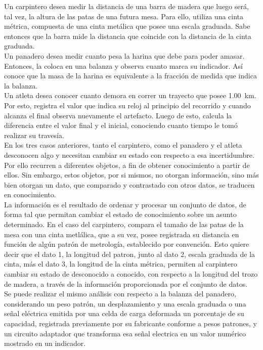Un carpintero desea medir la distancia de una barra de madera que luego será, tal vez, la altura de las patas de una futura mesa. Para ello, utiliza una cinta métrica, compuesta de una cinta metálica que posee una escala graduada. Sabe entonces que la barra mide la distancia que coincide con la distancia de la cinta graduada.\\

Un panadero desea medir cuanto pesa la harina que debe para poder amasar. Entonces, la coloca en una balanza y observa cuanto marca su indicador. Así conoce que la masa de la harina es equivalente a la fracción de medida que indica la balanza.\\

Un atleta desea conocer cuanto demora en correr un trayecto que posee \SI{1.00}{\kilo\meter}. Por esto, registra el valor que indica su reloj al principio del recorrido y cuando alcanza el final observa nuevamente el artefacto. Luego de esto, calcula la diferencia entre el valor final y el inicial, conociendo cuanto tiempo le tomó realizar su travesía.\\

En los tres casos anteriores, tanto el carpintero, como el panadero y el atleta desconocen algo y necesitan cambiar su estado con respecto a esa incertidumbre. Por ello recurren a diferentes objetos, a fin de obtener conocimiento a partir de ellos. Sin embargo, estos objetos, por si mismos, no otorgan información, sino más bien otorgan un dato, que comparado y contrastado con otros datos, se traducen en conocimiento.\\

La información es el resultado de ordenar y procesar un conjunto de datos, de forma tal que permitan cambiar el estado de conocimiento sobre un asunto determinado. En el caso del carpintero, compara el tamaño de las patas de la mesa con una cinta metlálica, que a su vez, posee registrada su distancia en función de algún patrón de metrología, establecido por convención. Esto quiere decir que el dato 1, la longitud del patron, junto al dato 2, escala graduada de la cinta, más el dato 3, la longitud de la cinta métrica, permiten al carpintero cambiar su estado de desconocido a conocido, con respecto a la longitud del trozo de madera, a través de la información proporcionada por el conjunto de datos.\\

Se puede realizar el mismo análisis con respecto a la balanza del panadero, considerando un peso patrón, un desplazamiento y una escala graduada o una señal eléctrica emitida por una celda de carga deformada un porcentaje de su capacidad, registrada previamente por su fabricante conforme a pesos patrones, y un circuito adaptador que transforma esa señal electrica en un valor numérico mostrado en un indicador.\\

